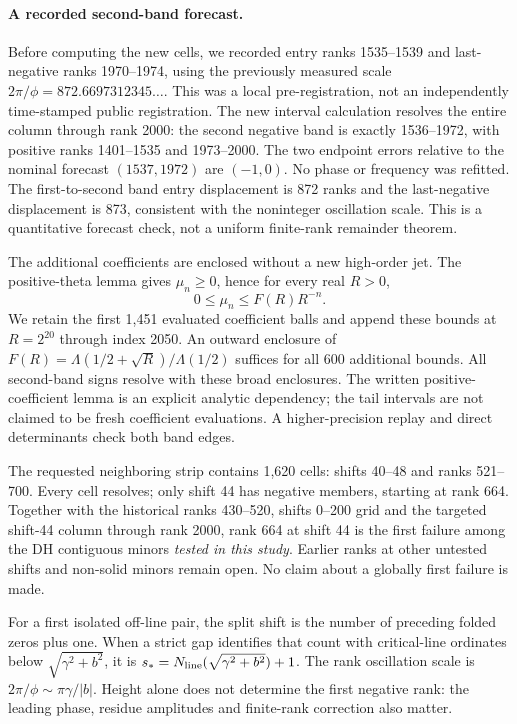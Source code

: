 \documentclass[11pt]{article}
\theoremstyle{remark}
\begin{document}
\paragraph{A recorded second-band forecast.}
Before computing the new cells, we recorded entry ranks 1535--1539 and
last-negative ranks 1970--1974, using the previously measured scale
\(2\pi/\phi=872.6697312345\ldots\). This was a local pre-registration,
not an independently time-stamped public registration. The new interval
calculation resolves the entire column through rank 2000: the second
negative band is exactly 1536--1972, with positive ranks 1401--1535 and
1973--2000. The two endpoint errors relative to the nominal forecast
\((1537,1972)\) are \((-1,0)\). No phase or frequency was refitted.
The first-to-second band entry displacement is 872 ranks and the
last-negative displacement is 873, consistent with the noninteger
oscillation scale. This is a quantitative forecast check, not a uniform
finite-rank remainder theorem.

The additional coefficients are enclosed without a new high-order jet.
The positive-theta lemma gives \(\mu_n\ge0\), hence for every real \(R>0\),
\[
 0\le\mu_n\le F(R)R^{-n}.
\]
We retain the first 1,451 evaluated coefficient balls and append these
bounds at \(R=2^{20}\) through index 2050. An outward enclosure of
\(F(R)=\Lambda(1/2+\sqrt R)/\Lambda(1/2)\) suffices for all 600 additional
bounds. All second-band signs resolve with these broad enclosures.
The written positive-coefficient lemma is an explicit analytic dependency;
the tail intervals are not claimed to be fresh coefficient evaluations.
A higher-precision replay and direct determinants check both band edges.

The requested neighboring strip contains 1,620 cells: shifts 40--48 and
ranks 521--700. Every cell resolves; only shift 44 has negative members,
starting at rank 664. Together with the historical ranks 430--520,
shifts 0--200 grid and the targeted shift-44 column through rank 2000,
rank 664 at shift 44 is the first failure among the DH contiguous minors
\emph{tested in this study}. Earlier ranks at other untested shifts and
non-solid minors remain open. No claim about a globally first failure is
made.

For a first isolated off-line pair, the split shift is the number of
preceding folded zeros plus one. When a strict gap identifies that count
with critical-line ordinates below \(\sqrt{\gamma^2+b^2}\), it is
\(s_*=N_{\rm line}(\sqrt{\gamma^2+b^2})+1\).
The rank oscillation scale is \(2\pi/\phi\sim\pi\gamma/|b|\).
Height alone does not determine the first negative rank: the leading
phase, residue amplitudes and finite-rank correction also matter.
\end{document}
